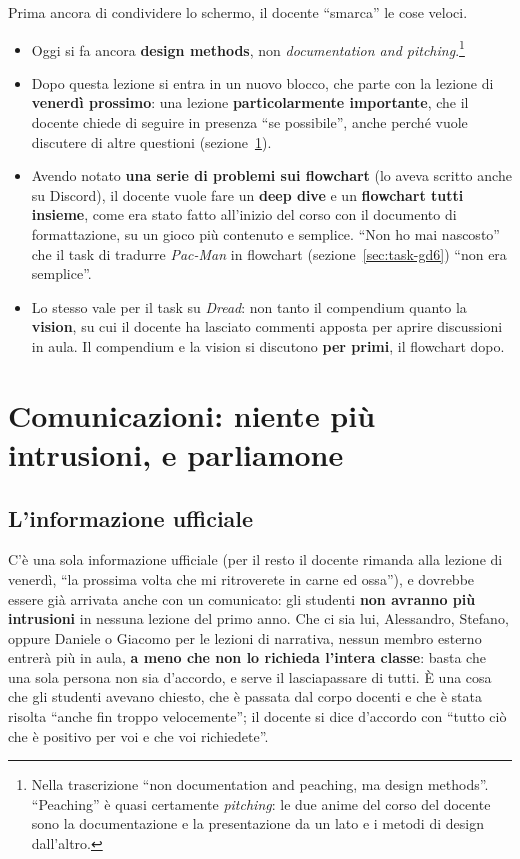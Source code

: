 Prima ancora di condividere lo schermo, il docente ``smarca'' le cose
veloci.
\begin{itemize}
  \item Oggi si fa ancora \textbf{design methods}, non
        \emph{documentation and pitching}.\footnote{Nella trascrizione ``non
        documentation and peaching, ma design methods''. ``Peaching'' è
        quasi certamente \emph{pitching}: le due anime del corso del docente
        sono la documentazione e la presentazione da un lato e i metodi di
        design dall'altro.}
  \item Dopo questa lezione si entra in un nuovo blocco, che parte con la
        lezione di \textbf{venerdì prossimo}: una lezione
        \textbf{particolarmente importante}, che il docente chiede di seguire
        in presenza ``se possibile'', anche perché vuole discutere di
        altre questioni (sezione~\ref{gd15:sec:comunicazioni}).
  \item Avendo notato \textbf{una serie di problemi sui flowchart} (lo aveva
        scritto anche su Discord), il docente vuole fare un \textbf{deep
        dive} e un \textbf{flowchart tutti insieme}, come era stato fatto
        all'inizio del corso con il documento di formattazione, su un gioco
        più contenuto e semplice. ``Non ho mai nascosto'' che il task di
        tradurre \emph{Pac-Man} in flowchart (sezione~\ref{sec:task-gd6})
        ``non era semplice''.
  \item Lo stesso vale per il task su \emph{Dread}: non tanto il compendium
        quanto la \textbf{vision}, su cui il docente ha lasciato commenti
        apposta per aprire discussioni in aula. Il compendium e la vision si
        discutono \textbf{per primi}, il flowchart dopo.
\end{itemize}

\section{Comunicazioni: niente più intrusioni, e parliamone}
\label{gd15:sec:comunicazioni}

\subsection{L'informazione ufficiale}

C'è una sola informazione ufficiale (per il resto il docente rimanda alla
lezione di venerdì, ``la prossima volta che mi ritroverete in carne ed
ossa''), e dovrebbe essere già arrivata anche con un comunicato: gli studenti
\textbf{non avranno più intrusioni} in nessuna lezione del primo anno.
Che ci sia lui, Alessandro, Stefano, oppure Daniele o Giacomo per le lezioni
di narrativa, nessun membro esterno entrerà più in aula, \textbf{a meno che
non lo richieda l'intera classe}: basta che una sola persona non sia
d'accordo, e serve il lasciapassare di tutti. È una cosa che gli studenti
avevano chiesto, che è passata dal corpo docenti e che è stata risolta
``anche fin troppo velocemente''; il docente si dice d'accordo con
``tutto ciò che è positivo per voi e che voi richiedete''.

